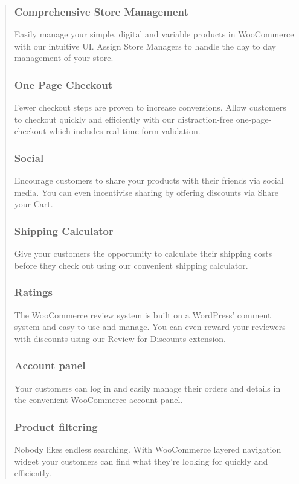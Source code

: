 \documentclass[35pt]{report}
\begin{document}
\begin{quote}
					\subsubsection{Comprehensive Store Management}
					Easily manage your simple, digital and variable products in WooCommerce with our intuitive UI. Assign Store Managers to handle the day to day management of your store.
		
					\subsubsection{One Page Checkout}
					Fewer checkout steps are proven to increase conversions. Allow customers to checkout quickly and efficiently with our distraction-free one-page-checkout which includes real-time form validation.

					\subsubsection{Social}
					Encourage customers to share your products with their friends via social media. You can even incentivise sharing by offering discounts via Share your Cart.

					\subsubsection{Shipping Calculator}
					Give your customers the opportunity to calculate their shipping costs before they check out using our convenient shipping calculator.

					\subsubsection{Ratings}
					The WooCommerce review system is built on a WordPress' comment system and easy to use and manage. You can even reward your reviewers with discounts using our Review for Discounts extension.

					\subsubsection{Account panel}
					Your customers can log in and easily manage their orders and details in the convenient WooCommerce account panel.

					\subsubsection{Product filtering}
					Nobody likes endless searching. With WooCommerce layered navigation widget your customers can find what they're looking for quickly and efficiently.


\end{quote}
\end{document}
